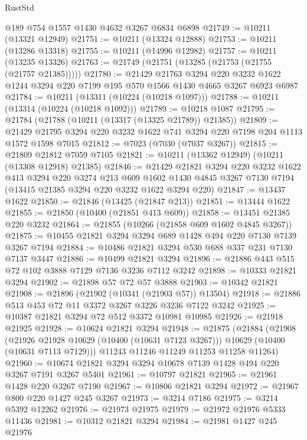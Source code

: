 \begin{lexlean}{RustStd}
\begin{coremodule}
{\begin{coremodule}
{{{{{{{{{{{{{{{{{{{{{{{{{    @189
    @754
    @1557
    @1430
    @4632
    @3267
    @6834
    @6898
@21749 := @10211 (@13321 @12949)
@21751 := @10211 (@13324 @12888)
@21753 := @10211 (@13286 @13318)
@21755 := @10211 (@14996 @12982)
@21757 := @10211 (@13235 @13326)
@21763 := @21749 (@21751 (@13285 (@21753 (@21755 (@21757 @21385)))))
@21780 := @21429
    @21763
    @3294
    @220
    @3232
    @1622
    @1244
    @3294
    @220
    @7199
    @195
    @570
    @1566
    @1430
    @4665
    @3267
    @6923
    @6987
@21784 := @10211 (@13311 (@10224 (@10218 @1097)))
@21788 := @10211 (@13314 (@10224 (@10218 @1092)))
@21789 := @10218 @1087
@21795 := @21784 (@21788 (@10211 (@13317 (@13325 @21789)) @21385))
@21809 := @21429 @21795 @3294 @220 @3232 @1622 @741 @3294 @220 @7198 @204 @1113 @1572 @1598 @7015
@21812 := @7023 (@7030 (@7037 @3267))
@21815 := @21809 @21812 @7059 @7105
@21821 := @10211 (@13362 @12949) (@10211 (@13308 @12918) @21385)
@21846 := @21429
    @21821
    @3294
    @220
    @3232
    @1622
    @413
    @3294
    @220
    @3274
    @213
    @609
    @1602
    @1430
    @4845
    @3267
    @7130
    @7194
    (@13415 @21385 @3294 @220 @3232 @1622 @3294 @220)
@21847 := @13437 @1622
@21850 := @21846 (@13425 (@21847 @213))
@21851 := @13444 @1622
@21855 := @21850 (@10400 (@21851 @413 @609))
@21858 := @13451 @21385 @220 @3232
@21864 := @21855 (@10266 (@21858 @609 @1602 @4845 @3267))
@21875 := @10455 @21821 @3294 @3294 @689 @1428 @494 @220 @7130 @7139 @3267 @7194
@21884 := @10486 @21821 @3294 @530 @688 @337 @231 @7130 @7137 @3447
@21886 := @10499 @21821 @3294
@21896 := @21886 @443 @515 @72 @102 @3888 @7129 @7136 @3236 @7112 @3242
@21898 := @10333 @21821 @3294
@21902 := @21898 @57 @72 @57 @3888
@21903 := @10342 @21821
@21908 := @21896 (@21902 (@10341 (@21903 @57)) @13504)
@21918 := @21886 @513 @453 @72 @11 @3372 @3267 @3226 @3236 @7122 @3242
@21925 := @10387 @21821 @3294 @72 @512 @3372 @10981 @10985
@21926 := @21918 @21925
@21928 := @10624 @21821 @3294
@21948 := @21875
    (@21884
      (@21908
        (@21926 @21928 @10629 (@10400 (@10631 @7123 @3267)))
        @10629
        (@10400 (@10631 @7113 @7129)))
      @11243
      @11246
      @11249
      @11253
      @11258
      @11264)
@21960 := @10674 @21821 @3294 @3294 @10678 @7139 @1428 @494 @220 @3267 @7191 @3267 @5401
@21961 := @10797 @21821
@21965 := @21961 @1428 @220 @3267 @7190
@21967 := @10806 @21821 @3294
@21972 := @21967 @800 @220 @1427 @245 @3267
@21973 := @3214 @7186
@21975 := @3214 @5392 @12262
@21976 := @21973 @21975
@21979 := @21972 @21976 @5333 @11436
@21981 := @10312 @21821 @3294
@21984 := @21981 @1427 @245 @21976
}}}}}}}}}}}}}}}}}}}}}}}}}
\end{coremodule}}
\end{coremodule}
\end{lexlean}
